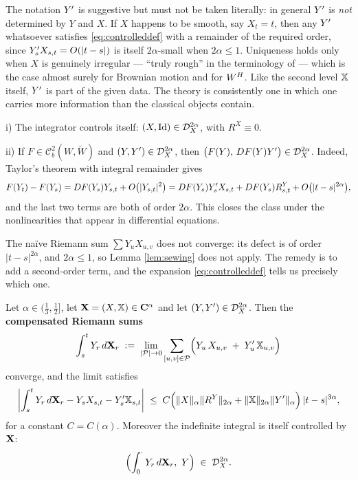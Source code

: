\begin{remark}\label{rem:gubinellinotunique}
The notation $Y'$ is suggestive but must not be taken literally: in general $Y'$ is \emph{not}
determined by $Y$ and $X$. If $X$ happens to be smooth, say $X_t = t$, then any $Y'$ whatsoever
satisfies \eqref{eq:controlleddef} with a remainder of the required order, since
$Y'_s X_{s,t} = O(|t-s|)$ is itself $2\alpha$-small when $2\alpha \leq 1$. Uniqueness holds only
when $X$ is genuinely irregular --- ``truly rough'' in the terminology of \cite[Ch.\ 6]{frizhairer2020}
--- which is the case almost surely for Brownian motion and for $W^{H}$. Like the second level $\mathbb{X}$
itself, $Y'$ is part of the given data. The theory is consistently one in which one carries more
information than the classical objects contain.
\end{remark}

\begin{example}\label{ex:controlledexamples}
i) The integrator controls itself: $(X, \mathrm{Id}) \in \mathcal{D}^{2\alpha}_{X}$, with $R^X \equiv 0$.

ii) If $F \in \mathcal{C}^2_b(W,\widetilde W)$ and $(Y,Y') \in \mathcal{D}^{2\alpha}_{X}$, then
$\bigl(F(Y),\,DF(Y)Y'\bigr) \in \mathcal{D}^{2\alpha}_{X}$. Indeed, Taylor's theorem with integral remainder gives
\[
F(Y_t)-F(Y_s) = DF(Y_s)Y_{s,t} + O\bigl(|Y_{s,t}|^2\bigr)
= DF(Y_s)Y'_s X_{s,t} + DF(Y_s)R^Y_{s,t} + O\bigl(|t-s|^{2\alpha}\bigr),
\]
and the last two terms are both of order $2\alpha$. This closes the class under the nonlinearities
that appear in differential equations.
\end{example}

\medskip

The naïve Riemann sum $\sum Y_u X_{u,v}$ does not
converge: its defect is of order $|t-s|^{2\alpha}$, and $2\alpha \leq 1$, so Lemma \ref{lem:sewing}
does not apply. The remedy is to add a second-order term, and the expansion \eqref{eq:controlleddef}
tells us precisely which one.

\begin{theorem}[Gubinelli]\label{thm:gubinelli}
Let $\alpha \in (\tfrac13,\tfrac12]$, let $\mathbf{X} = (X,\mathbb{X})\in\mathbf{C}^{\alpha}$ and let
$(Y,Y') \in \mathcal{D}^{2\alpha}_{X}$. Then the \textbf{compensated Riemann sums}
\begin{equation}\label{eq:roughintegral}
\int_s^t Y_r\,d\mathbf{X}_r \;:=\; \lim_{|\mathcal{P}|\to0} \sum_{[u,v]\in\mathcal{P}} \Bigl( Y_u\,X_{u,v} \;+\; Y'_u\,\mathbb{X}_{u,v} \Bigr)
\end{equation}
converge, and the limit satisfies
\begin{equation}\label{eq:roughintegralestimate}
\biggl| \int_s^t Y_r\,d\mathbf{X}_r - Y_s X_{s,t} - Y'_s \mathbb{X}_{s,t} \biggr|
\;\leq\; C\Bigl( \lVert X\rVert_\alpha \lVert R^Y\rVert_{2\alpha} + \lVert \mathbb{X}\rVert_{2\alpha}\lVert Y'\rVert_\alpha \Bigr)\,|t-s|^{3\alpha},
\end{equation}
for a constant $C = C(\alpha)$. Moreover the indefinite integral is itself controlled by $\mathbf{X}$:
\begin{equation}\label{eq:integraliscontrolled}
\Bigl( \int_0^{\cdot} Y_r\,d\mathbf{X}_r,\ Y \Bigr) \;\in\; \mathcal{D}^{2\alpha}_{X}.
\end{equation}
\end{theorem}

